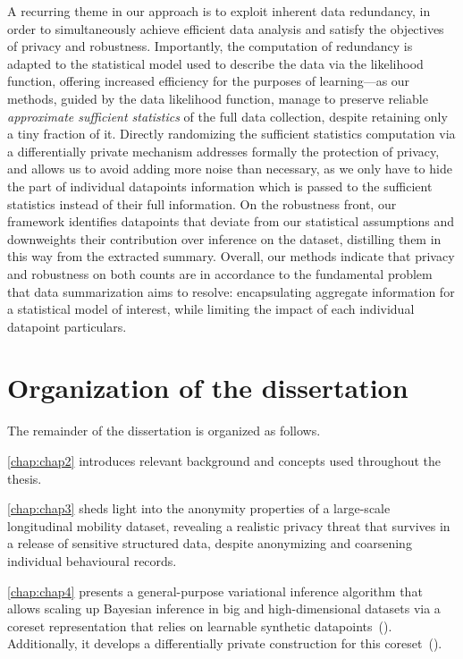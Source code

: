 A recurring theme in our approach is to exploit inherent data redundancy, in order to simultaneously achieve efficient data analysis and satisfy the objectives of privacy and robustness. Importantly, the computation of redundancy is adapted to the statistical model used to describe the data via the likelihood function, offering increased efficiency for the purposes of learning---as our methods, guided by the data likelihood function, manage to preserve reliable \emph{approximate sufficient statistics} of the full data collection, despite retaining only a tiny fraction of it. Directly randomizing the sufficient statistics computation via a differentially private mechanism addresses formally the protection of privacy, and allows us to avoid adding more noise than necessary, as we only have to hide the part of individual datapoints information which is passed to the sufficient statistics instead of their full information. On the robustness front, our framework identifies datapoints that deviate from our statistical assumptions and downweights their contribution over inference on the dataset, distilling them in this way from the extracted summary. Overall, our methods indicate that privacy and robustness on both counts are in accordance to the fundamental problem that data summarization aims to resolve: encapsulating aggregate information for a statistical model of interest, while limiting the impact of each individual datapoint particulars.


\section{Organization of the dissertation}
\label{sec:thesis-organization}
The remainder of the dissertation is organized as follows. 

\cref{chap:chap2} introduces relevant background and concepts used throughout the thesis. 

\cref{chap:chap3} sheds light into the anonymity properties of a large-scale longitudinal mobility dataset, revealing a realistic privacy threat that survives in a release of sensitive structured data, despite anonymizing and coarsening individual behavioural records. 

\cref{chap:chap4} presents a general-purpose variational inference algorithm that allows scaling up Bayesian inference in big and high-dimensional datasets via a coreset representation that relies on learnable synthetic datapoints~(\psvi). Additionally, it develops a differentially private construction for this coreset~(\dpsvi). 

